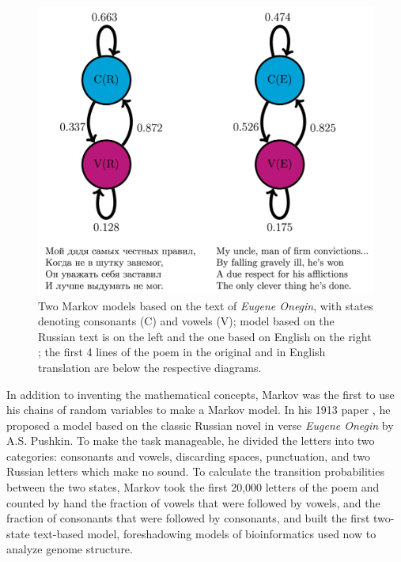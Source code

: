 \documentclass[
  letterpaper,
  DIV=11,
  numbers=noendperiod]{scrreprt}
\begin{document}
\begin{figure}

{\centering \includegraphics{./ch12/onegin_markov_diag.png}

}

\caption{Two Markov models based on the text of \emph{Eugene Onegin},
with states denoting consonants (C) and vowels (V); model based on the
Russian text is on the left and the one based on English on the right
\cite{hayes_first_2012}; the first 4 lines of the poem in the original
\cite{onegin-pushkin} and in English translation \cite{onegin-falen} are
below the respective diagrams.}

\end{figure}

In addition to inventing the mathematical concepts, Markov was the first
to use his chains of random variables to make a Markov model. In his
1913 paper \cite{markov_example_1913}, he proposed a model based on the
classic Russian novel in verse \emph{Eugene Onegin} by A.S. Pushkin. To
make the task manageable, he divided the letters into two categories:
consonants and vowels, discarding spaces, punctuation, and two Russian
letters which make no sound. To calculate the transition probabilities
between the two states, Markov took the first 20,000 letters of the poem
and counted by hand the fraction of vowels that were followed by vowels,
and the fraction of consonants that were followed by consonants, and
built the first two-state text-based model, foreshadowing models of
bioinformatics used now to analyze genome structure.
\end{document}
